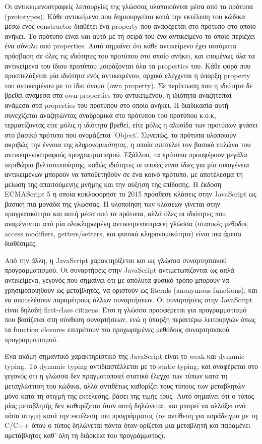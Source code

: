 \documentclass[../thesis.tex]{subfiles}
\begin{document}
Οι αντικειμενοστραφείς λειτουργίες της γλώσσας υλοποιούνται μέσα από τα πρότυπα (prototypes).
Κάθε αντικείμενο που δημιουργείται κατά την εκτέλεση του κώδικα μέσω ενός constructor διαθέτει ένα property που αναφέρεται στο πρότυπο στο οποίο ανήκει.
Το πρότυπο είναι και αυτό με τη σειρά του ένα αντικείμενο το οποίο περιέχει ένα σύνολο από properties.
Αυτό σημαίνει ότι κάθε αντικείμενο έχει αυτόματα πρόσβαση σε όλες τις ιδιότητες του προτύπου στο οποίο ανήκει, και επομένως \textit{όλα} τα αντικείμενα του ίδιου προτύπου μοιράζονται όλα τα properties του.
Κάθε φορά που προσπελάζεται μία ιδιότητα ενός αντικειμένου, αρχικά ελέγχεται η ύπαρξη property του αντικειμένου με το ίδιο όνομα (own property).
Σε περίπτωση που η ιδιότητα δε βρεθεί ανάμεσα στα own properties του αντικειμένου, η ιδιότητα αναζητείται ανάμεσα στα properties του προτύπου στο οποίο ανήκει.
Η διαδικασία αυτή συνεχίζεται αναζητώντας αναδρομικά στο πρότυπου του προτύπου κ.ο.κ, τερματίζοντας είτε μόλις η ιδιότητα βρεθεί, είτε μόλις η αλυσίδα των προτύπων φτάσει στο βασικό πρότυπο που ονομάζεται 'Object'.
Συνεπώς, τα πρότυπα υλοποιούν ακριβώς την έννοια της \textit{κληρονομικότητας}, η οποία αποτελεί τον βασικό πυλώνα του αντικειμενοστραφούς προγραμματισμού.
Εξάλλου, τα πρότυπα προσφέρουν μεγάλα περιθώρια βελτιστοποίησης, καθώς ιδιότητες οι οποίες είναι ίδιες για μία οικογένεια αντικειμένων μπορούν να τοποθετηθούν σε ένα κοινό πρότυπο, με αποτέλεσμα τη μείωση της απαιτούμενης μνήμης και την αύξηση της επίδοσης.
Η έκδοση ECMAScript 5 η οποία κυκλοφόρησε το 2015 πρόσθεσε κλάσεις στην JavaScript ως βασική πια μονάδα της γλώσσας.
Η υλοποίηση των κλάσεων γίνεται στην πραγματικότητα και αυτή μέσα από τα πρότυπα, αλλά όλες οι ιδιότητες που αναμένονται από μία ολοκληρωμένη αντικειμενοστραφή γλώσσα (στατικές μέθοδοι, access modifiers, getters/setters, και φυσικά κληρονομικότητα) είναι πια άμεσα διαθέσιμες.

Από την άλλη, η JavaScript χαρακτηρίζεται και ως γλώσσα συναρτησιακού προγραμματισμού.
Οι συναρτήσεις στην JavaScript αντιμετωπίζονται ως απλά αντικείμενα, γεγονός που σημαίνει ότι με απόλυτα φυσικό τρόπο μπορούν να χρησιμοποιηθούν ως μεταβλητές, να οριστούν ως literals (anonymous functions), και να αποτελέσουν παραμέτρους άλλων συναρτήσεων.
Οι συναρτήσεις στην JavaScript είναι δηλαδή first-class citizens.
Έτσι η γλώσσα προσφέρεται για προγραμματισμό που βασίζεται στη σύνθεση συναρτήσεων, ενώ η ύπαρξη περαιτέρω λειτουργιών όπως τα function closures επιτρέπουν πιο προχωρημένες μεθόδους συναρτησιακού προγραμματισμού.

Ένα ακόμη σημαντικό χαρακτηριστικό της JavaScript είναι το weak και dynamic typing.
Το dynamic typing αντιδιαστέλλεται με το static typing, και αναφέρεται στο γεγονός ότι η γλώσσα δεν πραγματοποιεί στατικό έλεγχο των τύπων κατά τη μεταγλώττιση του κώδικα, αλλά αντιθέτως καθορίζει τους τύπους των μεταβλητών μόνο κατά τη στιγμή της εκτέλεσης, βάσει της τιμής τους.
Αυτό σημαίνει ότι ο τύπος μίας μεταβλητής δεν καθορίζεται όταν αυτή δηλώνεται, και μπορεί να αλλάξει ανά πάσα στιγμή κατά την εκτέλεση του προγράμματος (σε αντίθεση για παράδειγμα με τη C/C++ όπου ο τύπος δηλώνεται πάντα όταν ορίζεται μια μεταβλητή και παραμένει αμετάβλητος καθ' όλη τη διάρκεια του προγράμματος).
\end{document}
